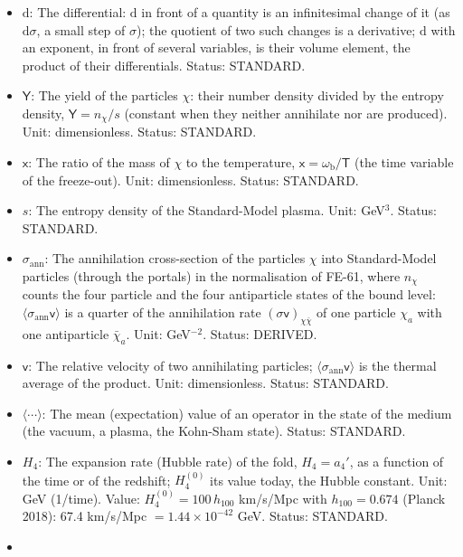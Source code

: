 \documentclass[
  10pt,
]{article}
\providecommand{\tightlist}{%
  \setlength{\itemsep}{0pt}\setlength{\parskip}{0pt}}
\begin{document}
\begin{itemize}
\tightlist
\item
  \(\mathrm{d}\): The differential: \(\mathrm{d}\) in front of a
  quantity is an infinitesimal change of it (as \(\mathrm{d}\sigma\), a
  small step of \(\sigma\)); the quotient of two such changes is a
  derivative; \(\mathrm{d}\) with an exponent, in front of several
  variables, is their volume element, the product of their
  differentials. Status: STANDARD.
\item
  \(\mathsf{Y}\): The yield of the particles \(\chi\): their number
  density divided by the entropy density, \(\mathsf{Y} = n_\chi/s\)
  (constant when they neither annihilate nor are produced). Unit:
  dimensionless. Status: STANDARD.
\item
  \(\mathsf{x}\): The ratio of the mass of \(\chi\) to the temperature,
  \(\mathsf{x} = \omega_{\mathrm{b}}/\mathsf{T}\) (the time variable of
  the freeze-out). Unit: dimensionless. Status: STANDARD.
\item
  \(s\): The entropy density of the Standard-Model plasma. Unit:
  GeV\(^3\). Status: STANDARD.
\item
  \(\sigma_{\mathrm{ann}}\): The annihilation cross-section of the
  particles \(\chi\) into Standard-Model particles (through the portals)
  in the normalisation of FE-61, where \(n_\chi\) counts the four
  particle and the four antiparticle states of the bound level:
  \(\langle\sigma_{\mathrm{ann}}\mathsf{v}\rangle\) is a quarter of the
  annihilation rate \((\sigma\mathsf{v})_{\chi\bar\chi}\) of one
  particle \(\chi_a\) with one antiparticle \(\bar\chi_a\). Unit:
  GeV\(^{-2}\). Status: DERIVED.
\item
  \(\mathsf{v}\): The relative velocity of two annihilating particles;
  \(\langle\sigma_{\mathrm{ann}}\mathsf{v}\rangle\) is the thermal
  average of the product. Unit: dimensionless. Status: STANDARD.
\item
  \(\langle\cdots\rangle\): The mean (expectation) value of an operator
  in the state of the medium (the vacuum, a plasma, the Kohn-Sham
  state). Status: STANDARD.
\item
  \(H_4\): The expansion rate (Hubble rate) of the fold, \(H_4 = a_4'\),
  as a function of the time or of the redshift; \(H_4^{(0)}\) its value
  today, the Hubble constant. Unit: GeV (1/time). Value:
  \(H_4^{(0)} = 100\,h_{100}\) km/s/Mpc with \(h_{100} = 0.674\) (Planck
  2018): 67.4 km/s/Mpc \(= 1.44\times10^{-42}\) GeV. Status: STANDARD.
\item

\end{itemize}
\end{document}
